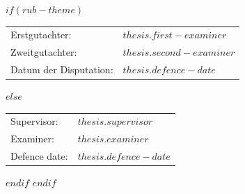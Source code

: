 \cleardoublepage
\thispagestyle{empty}
\vspace*{\fill}
$if(rub-theme)$
\begin{tabular}{@{}ll@{}}
  Erstgutachter: & $thesis.first-examiner$ \\
  Zweitgutachter: & $thesis.second-examiner$ \\
  Datum der Disputation: & $thesis.defence-date$
\end{tabular}
$else$
\begin{tabular}{@{}ll@{}}
  Supervisor: & $thesis.supervisor$ \\
  Examiner: & $thesis.examiner$ \\
  Defence date: & $thesis.defence-date$
\end{tabular}
$endif$
\cleardoublepage
$endif$
